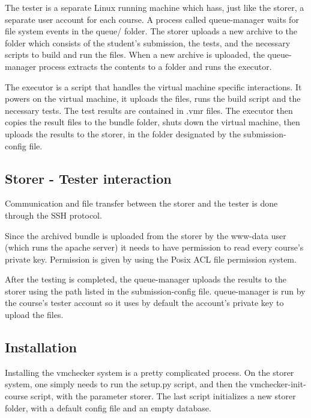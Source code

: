 The tester is a separate Linux running machine which hass, just like the storer,
a separate user account for each course. A process called queue-manager 
waits for file system events in the queue/ folder. The storer uploads a new
archive to the folder which consists of the student's submission, the tests, and
the necessary scripts to build and run the files. When a new archive is uploaded,
the queue-manager process extracts the contents to a folder and runs the executor.

\begin{center}
\end{center}

The executor is a script that handles the virtual machine specific interactions.
It powers on the virtual machine, it uploads the files, runs the build script and
 the necessary tests. The test results are contained in .vmr files.
The executor then copies the result files to the bundle folder, shuts down the
virtual machine, then uploads the results to the storer, in the folder designated
by the submission-config file.


\subsection{Storer - Tester interaction}
\label{sub-sec:interaction}

Communication and file transfer between the storer and the tester is done
through the SSH protocol. 

Since the archived bundle is uploaded from the storer by the www-data user (which
runs the apache server) it needs to have permission to read every course's private key. 
Permission is given by using the Posix ACL file permission system.

After the testing is completed, the queue-manager uploads the results to the storer
using the path listed in the submission-config file. queue-manager is run by the 
course's tester account so it uses by default the account's private key to upload
the files.

\subsection{Installation}
\label{sub-sec:install}

Installing the vmchecker system is a pretty complicated process.
On the storer system, one simply needs to run the setup.py script, and then 
the vmchecker-init-course script, with the parameter storer. The last script
initializes a new storer folder, with a default config file and an empty database.

